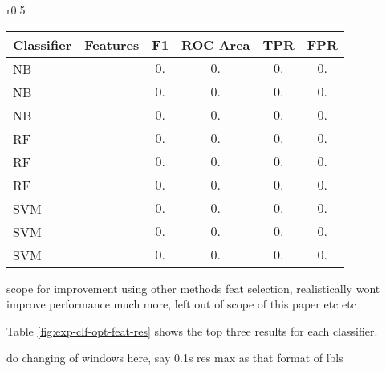             \begin{wraptable}{r}{0.5\textwidth}
                \scriptsize
                \singlespacing
                \centering
                    \begin{tabular}{ |l|c|c|c|c|c| } 
                        \hline
                        Classifier & Features & F1 & ROC Area & TPR & FPR \\ 
                        \hline
                        NB && $0.$ & $0.$  & $0.$ & $0.$\\
                        NB && $0.$ & $0.$ & $0.$ & $0.$\\
                        NB && $0.$ & $0.$ & $0.$ & $0.$\\
                        \hline
                        RF && $0.$ & $0.$ & $0.$ & $0.$\\
                        RF && $0.$ & $0.$ & $0.$ & $0.$\\
                        RF && $0.$ & $0.$ & $0.$ & $0.$\\
                        \hline
                        SVM && $0.$ & $0.$ & $0.$ & $0.$\\
                        SVM && $0.$ & $0.$ & $0.$ & $0.$\\
                        SVM && $0.$ & $0.$ & $0.$ & $0.$\\
                        \hline
                    \end{tabular}
                \caption{Results of feature selection.}
                \label{fig:exp-clf-opt-feat-res}
            \end{wraptable}
            
            scope for improvement using other methods feat selection, realistically wont improve performance much more, left out of scope of this paper etc etc
            
            Table \ref{fig:exp-clf-opt-feat-res} shows the top three results for each classifier. 
            
            do changing of windows here, say 0.1s res max as that format of lbls
    
    
